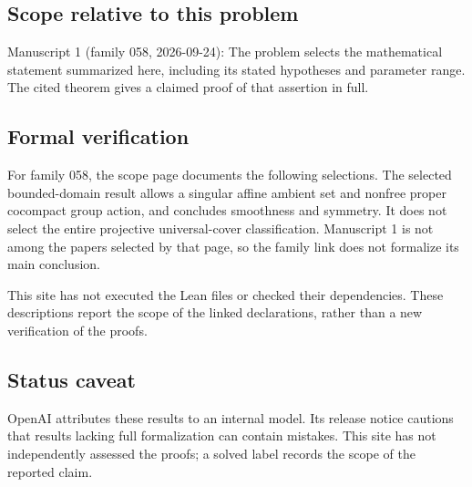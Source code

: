 \documentclass[11pt]{article}
\begin{document}
\subsection{Scope relative to this problem}
Manuscript 1 (family 058, 2026-09-24): The problem selects the mathematical statement summarized here, including its stated hypotheses and parameter range. The cited theorem gives a claimed proof of that assertion in full.

\subsection{Formal verification}
For family 058, the scope page documents the following selections. The selected bounded-domain result allows a singular affine ambient set and nonfree proper cocompact group action, and concludes smoothness and symmetry. It does not select the entire projective universal-cover classification. Manuscript 1 is not among the papers selected by that page, so the family link does not formalize its main conclusion.

This site has not executed the Lean files or checked their dependencies. These descriptions report the scope of the linked declarations, rather than a new verification of the proofs.

\subsection{Status caveat}
OpenAI attributes these results to an internal model. Its release notice cautions that results lacking full formalization can contain mistakes. This site has not independently assessed the proofs; a solved label records the scope of the reported claim.
\end{document}
